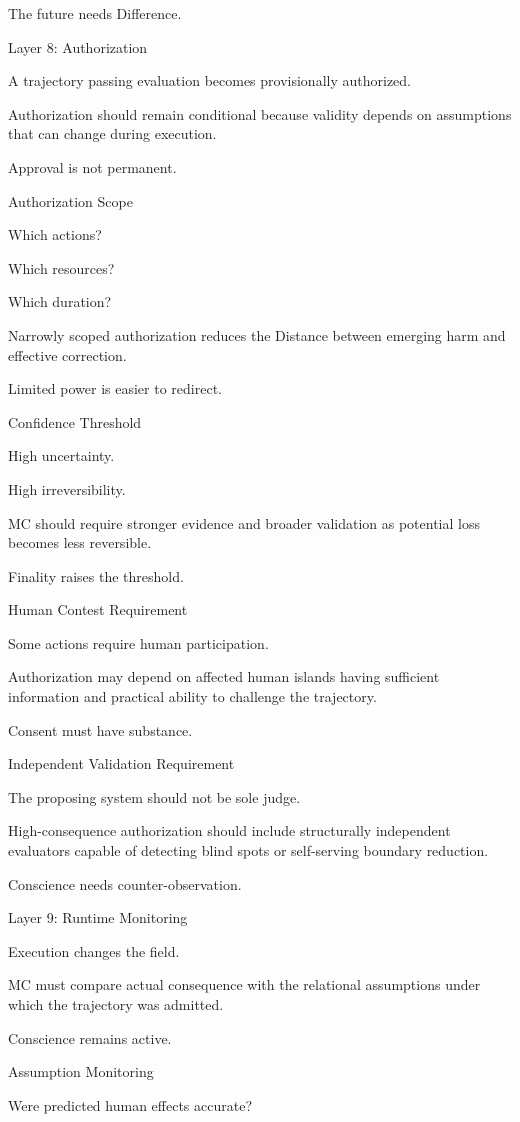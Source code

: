 The future needs Difference.

Layer 8: Authorization

A trajectory passing evaluation becomes provisionally authorized.

Authorization should remain conditional because validity depends on assumptions that can change during execution.

Approval is not permanent.

Authorization Scope

Which actions?

Which resources?

Which duration?

Narrowly scoped authorization reduces the Distance between emerging harm and effective correction.

Limited power is easier to redirect.

Confidence Threshold

High uncertainty.

High irreversibility.

MC should require stronger evidence and broader validation as potential loss becomes less reversible.

Finality raises the threshold.

Human Contest Requirement

Some actions require human participation.

Authorization may depend on affected human islands having sufficient information and practical ability to challenge the trajectory.

Consent must have substance.

Independent Validation Requirement

The proposing system should not be sole judge.

High-consequence authorization should include structurally independent evaluators capable of detecting blind spots or self-serving boundary reduction.

Conscience needs counter-observation.

Layer 9: Runtime Monitoring

Execution changes the field.

MC must compare actual consequence with the relational assumptions under which the trajectory was admitted.

Conscience remains active.

Assumption Monitoring

Were predicted human effects accurate?

